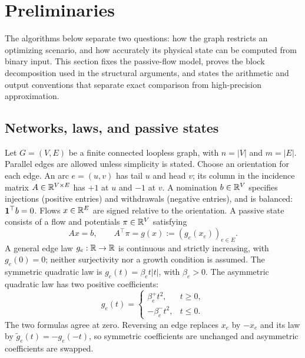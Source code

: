 \section{Preliminaries}
\label{sec:a-pre-preliminaries}

The algorithms below separate two questions: how the graph restricts an
optimizing scenario, and how accurately its physical state can be
computed from binary input. This section fixes the passive-flow model,
proves the block decomposition used in the structural arguments, and
states the arithmetic and output conventions that separate exact
comparison from high-precision approximation.

\subsection{Networks, laws, and passive states}
\label{subsec:a-pre-model}
Let $G=(V,E)$ be a finite connected loopless graph, with $n=|V|$ and
$m=|E|$. Parallel edges are allowed unless simplicity is stated.
Choose an orientation for each edge. An arc $e=(u,v)$ has tail $u$ and
head $v$; its column in the incidence matrix $A\in\mathbb{R}^{V\times E}$ has
$+1$ at $u$ and $-1$ at $v$. A nomination $b\in\mathbb{R}^V$ specifies injections
(positive entries) and withdrawals (negative entries), and is balanced:
$\mathbf{1}^\top b=0$. Flows $x\in\mathbb{R}^E$ are signed relative to the orientation.
A passive state consists of a flow and potentials $\pi\in\mathbb{R}^V$ satisfying
\begin{equation}
 Ax=b,\qquad A^\top\pi=g(x):=(g_e(x_e))_{e\in E}.
 \label{eq:a-pre-passive}
\end{equation}
A general edge law $g_e:\mathbb{R}\to\mathbb{R}$ is continuous and strictly increasing,
with $g_e(0)=0$; neither surjectivity nor a growth condition is assumed. The symmetric quadratic law is $g_e(t)=\beta_e t|t|$, with
$\beta_e>0$. The asymmetric quadratic law has two positive coefficients:
\[
 g_e(t)=\begin{cases}\beta_e^+t^2,&t\ge0,\\-\beta_e^-t^2,&t\le0.\end{cases}
\]
The two formulas agree at zero. Reversing an edge replaces $x_e$ by
$-x_e$ and its law by $\widetilde g_e(t)=-g_e(-t)$, so symmetric
coefficients are unchanged and asymmetric coefficients are swapped.

